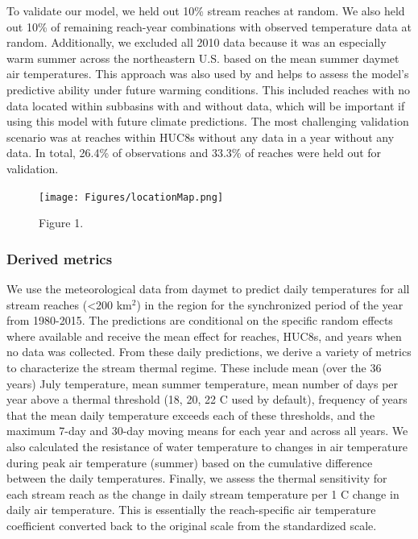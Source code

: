 \documentclass[]{article}
\begin{document}
To validate our model, we held out 10\% stream reaches at random. We
also held out 10\% of remaining reach-year combinations with observed
temperature data at random. Additionally, we excluded all 2010 data
because it was an especially warm summer across the northeastern U.S.
based on the mean summer daymet air temperatures. This approach was also
used by \citep{DeWeber2014a} and helps to assess the model's predictive
ability under future warming conditions. This included reaches with no
data located within subbasins with and without data, which will be
important if using this model with future climate predictions. The most
challenging validation scenario was at reaches within HUC8s without any
data in a year without any data. In total, 26.4\% of observations and
33.3\% of reaches were held out for validation.

\begin{figure}[htbp]
\centering
\texttt{[image: Figures/locationMap.png]}
\caption{Figure 1.}
\end{figure}

\subsubsection{Derived metrics}\label{derived-metrics}

We use the meteorological data from daymet to predict daily temperatures
for all stream reaches (\textless{}200 km\(^2\)) in the region for the
synchronized period of the year from 1980-2015. The predictions are
conditional on the specific random effects where available and receive
the mean effect for reaches, HUC8s, and years when no data was
collected. From these daily predictions, we derive a variety of metrics
to characterize the stream thermal regime. These include mean (over the
36 years) July temperature, mean summer temperature, mean number of days
per year above a thermal threshold (18, 20, 22 C used by default),
frequency of years that the mean daily temperature exceeds each of these
thresholds, and the maximum 7-day and 30-day moving means for each year
and across all years. We also calculated the resistance of water
temperature to changes in air temperature during peak air temperature
(summer) based on the cumulative difference between the daily
temperatures. Finally, we assess the thermal sensitivity for each stream
reach as the change in daily stream temperature per 1 C change in daily
air temperature. This is essentially the reach-specific air temperature
coefficient converted back to the original scale from the standardized
scale.
\end{document}
